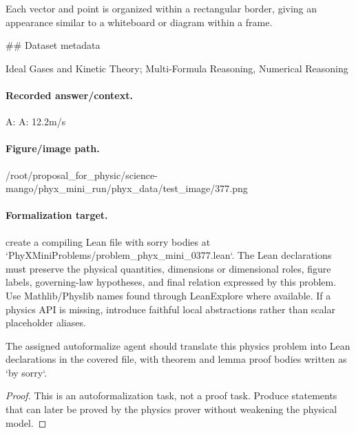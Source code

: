Each vector and point is organized within a rectangular border, giving an appearance similar to a whiteboard or diagram within a frame.

\#\# Dataset metadata

Ideal Gases and Kinetic Theory; Multi-Formula Reasoning, Numerical Reasoning

\paragraph{Recorded answer/context.}
A: A: 12.2m/s

\paragraph{Figure/image path.}
/root/proposal\_for\_physic/science-mango/phyx\_mini\_run/phyx\_data/test\_image/377.png

\paragraph{Formalization target.}
create a compiling Lean file with sorry bodies at `PhyXMiniProblems/problem\_phyx\_mini\_0377.lean`. The Lean declarations must preserve the physical quantities, dimensions or dimensional roles, figure labels, governing-law hypotheses, and final relation expressed by this problem.
Use Mathlib/Physlib names found through LeanExplore where available. If a physics API is missing, introduce faithful local abstractions rather than scalar placeholder aliases.

\begin{theorem}
\label{thm:physics:phyx_mini_0377:target}
The assigned autoformalize agent should translate this physics problem into Lean declarations in the covered file, with theorem and lemma proof bodies written as `by sorry`.
\end{theorem}
\begin{proof}
This is an autoformalization task, not a proof task. Produce statements that can later be proved by the physics prover without weakening the physical model.
\end{proof}

